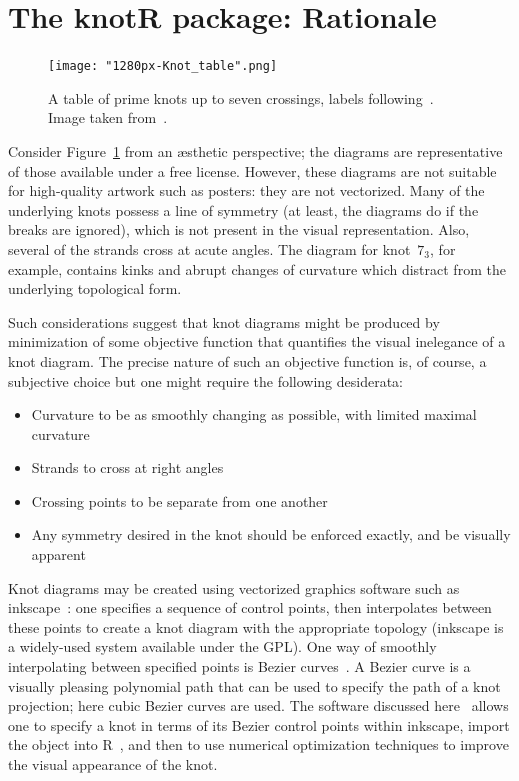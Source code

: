 \documentclass{birkjour}
\theoremstyle{definition}
\theoremstyle{remark}
\numberwithin{equation}{section}
\begin{document}
\section{The knotR package: Rationale}

\begin{figure}[h]
  \centering
  \texttt{[image: "1280px-Knot\_table".png]}
  \caption{A table of prime knots up \label{knot_table} to seven
    crossings, labels following~\cite{alexander1926}.  Image taken
    from~\cite{wikipedia_knot_theory}.}
\end{figure}

Consider Figure~\ref{knot_table} from an \ae sthetic perspective; the
diagrams are representative of those available under a free license.
However, these diagrams are not suitable for high-quality artwork such
as posters: they are not vectorized.  Many of the underlying knots
possess a line of symmetry (at least, the diagrams do if the breaks
are ignored), which is not present in the visual representation.
Also, several of the strands cross at acute angles.  The diagram for
knot~$7_3$, for example, contains kinks and abrupt changes of
curvature which distract from the underlying topological form.

Such considerations suggest that knot diagrams might be produced by
minimization of some objective function that quantifies the visual
inelegance of a knot diagram.  The precise nature of such an objective
function is, of course, a subjective choice but one might require the
following desiderata:

\begin{itemize}
\item Curvature to be as smoothly changing as possible, with limited maximal curvature
\item Strands to cross at right angles
\item Crossing points to be separate from one another
\item Any symmetry desired in the knot should be enforced exactly, and be visually apparent
\end{itemize}

Knot diagrams may be created using vectorized graphics software such
as inkscape~\cite{Inkscape}: one specifies a sequence of control
points, then interpolates between these points to create a knot
diagram with the appropriate topology (inkscape is a widely-used
system available under the GPL).  One way of smoothly interpolating
between specified points is Bezier curves~\cite{olsen2014}.  A Bezier
curve is a visually pleasing polynomial path that can be used to
specify the path of a knot projection; here cubic Bezier curves are
used.  The software discussed here~\cite{hankin2020} allows one to
specify a knot in terms of its Bezier control points within inkscape,
import the object into R~\cite{rcore2021}, and then to use numerical
optimization techniques to improve the visual appearance of the knot.
\end{document}
